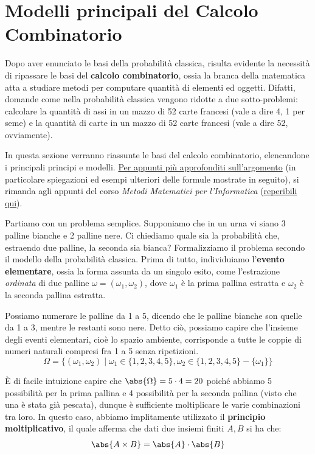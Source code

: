 \documentclass[a4paper, 12pt]{report}
\begin{document}
    \section{Modelli principali del Calcolo Combinatorio}

    Dopo aver enunciato le basi della probabilità classica, risulta evidente la necessità di ripassare le basi del \textbf{calcolo combinatorio}, ossia la branca della matematica atta a studiare metodi per computare quantità di elementi ed oggetti. Difatti, domande come  nella probabilità classica vengono ridotte a due sotto-problemi: calcolare la quantità di assi in un mazzo di 52 carte francesi (vale a dire 4, 1 per seme) e la quantità di carte in un mazzo di 52 carte francesi (vale a dire 52, ovviamente).

    In questa sezione verranno riassunte le basi del calcolo combinatorio, elencandone i principali principi e modelli. \underline{Per appunti più approfonditi sull'argomento} (in particolare spiegazioni ed esempi ulteriori delle formule mostrate in seguito), si rimanda agli appunti del corso \textit{Metodi Matematici per l'Informatica} (\href{https://github.com/Exyss/university-notes}{reperibili qui}).
    
    Partiamo con un problema semplice. Supponiamo che in un urna vi siano 3 palline bianche e 2 palline nere. Ci chiediamo quale sia la probabilità che,
    estraendo due palline, la seconda sia bianca? Formalizziamo il problema secondo il modello della probabilità classica. Prima di tutto, individuiamo l'\textbf{evento elementare}, ossia la forma assunta da un singolo esito, come l'estrazione \textit{ordinata} di due palline $\omega=(\omega_1,\omega_2)$, dove $\omega_1$ è la prima pallina estratta e $\omega_2$ è la seconda pallina estratta.
    
    Possiamo numerare le palline da 1 a 5, dicendo che le palline bianche son quelle da 1 a 3, mentre le restanti sono nere. Detto ciò, possiamo capire che l'insieme degli eventi elementari, cioè lo spazio ambiente, corrisponde a tutte le coppie di numeri naturali compresi fra 1 a 5 senza ripetizioni.
    \[\Omega = \{(\omega_1,\omega_2) \mid \omega_1 \in \{1,2,3,4,5\}, \omega_2 \in \{1,2,3,4,5\} - \{\omega_1\}\}\]

    È di facile intuizione capire che $\abs{\Omega}=5 \cdot 4 = 20$ poiché abbiamo 5 possibilità per la prima pallina e 4 possibilità per la seconda pallina (visto che una è stata già pescata), dunque è sufficiente moltiplicare le varie combinazioni tra loro. In questo caso, abbiamo implitamente utilizzato il \textbf{principio moltiplicativo}, il quale afferma che dati due insiemi finiti $A,B$ si ha che:
    \[\abs{A \times B} = \abs{A} \cdot \abs{B}\]
\end{document}
